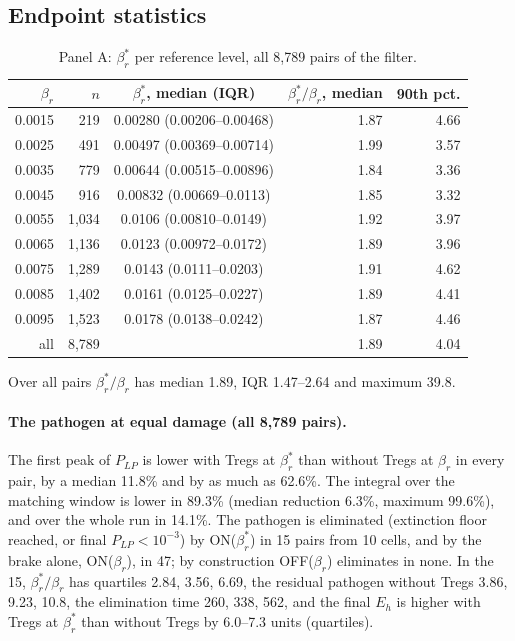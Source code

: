 \documentclass[11pt]{article}
\begin{document}
\subsection{Endpoint statistics}

\begin{table}[ht]
\centering
\caption{Panel A: $\beta_r^{*}$ per reference level, all 8{,}789 pairs of the filter.}
\label{tab:fig04_panelB}
\begin{tabular}{rrcrr}
\hline
$\beta_r$ & $n$ & $\beta_r^{*}$, median (IQR) & $\beta_r^{*}/\beta_r$, median & 90th pct. \\
\hline
0.0015 &   219 & 0.00280 (0.00206--0.00468) & 1.87 & 4.66 \\
0.0025 &   491 & 0.00497 (0.00369--0.00714) & 1.99 & 3.57 \\
0.0035 &   779 & 0.00644 (0.00515--0.00896) & 1.84 & 3.36 \\
0.0045 &   916 & 0.00832 (0.00669--0.0113) & 1.85 & 3.32 \\
0.0055 & 1{,}034 & 0.0106 (0.00810--0.0149)  & 1.92 & 3.97 \\
0.0065 & 1{,}136 & 0.0123 (0.00972--0.0172)  & 1.89 & 3.96 \\
0.0075 & 1{,}289 & 0.0143 (0.0111--0.0203)   & 1.91 & 4.62 \\
0.0085 & 1{,}402 & 0.0161 (0.0125--0.0227)   & 1.89 & 4.41 \\
0.0095 & 1{,}523 & 0.0178 (0.0138--0.0242)   & 1.87 & 4.46 \\
\hline
all & 8{,}789 & & 1.89 & 4.04 \\
\hline
\end{tabular}
\end{table}
Over all pairs $\beta_r^{*}/\beta_r$ has median 1.89, IQR 1.47--2.64 and maximum 39.8.

\paragraph{The pathogen at equal damage (all 8{,}789 pairs).}
The first peak of $P_{LP}$ is lower with Tregs at $\beta_r^{*}$ than without Tregs at $\beta_r$ in
every pair, by a median 11.8\% and by as much as 62.6\%. The integral over the matching window is
lower in 89.3\% (median reduction 6.3\%, maximum 99.6\%), and over the whole run in 14.1\%. The
pathogen is eliminated (extinction floor reached, or final $P_{LP} < 10^{-3}$)
by ON($\beta_r^{*}$) in 15 pairs from 10 cells, and by the brake alone, ON($\beta_r$), in 47; by
construction OFF($\beta_r$) eliminates in none. In the 15, $\beta_r^{*}/\beta_r$ has quartiles 2.84,
3.56, 6.69, the residual pathogen without Tregs 3.86, 9.23, 10.8, the elimination time 260, 338,
562, and the final $E_h$ is higher with Tregs at $\beta_r^{*}$ than without Tregs by 6.0--7.3
units (quartiles).
\end{document}

